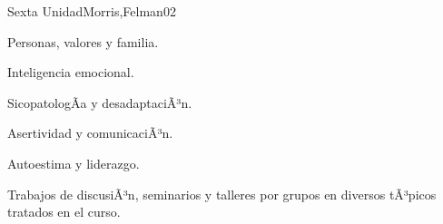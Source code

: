 \begin{syllabus}
\begin{unit}{Sexta Unidad}{Morris,Felman}{0}{2}
\begin{topics}
	\item Personas, valores y familia.
	\item Inteligencia emocional.
	\item SicopatologÃ­a y desadaptaciÃ³n.
	\item Asertividad y comunicaciÃ³n.
	\item Autoestima y liderazgo.
\end{topics}
\begin{unitgoals}
	\item Trabajos de discusiÃ³n, seminarios y talleres por grupos en diversos tÃ³picos tratados en el curso.
\end{unitgoals}
\end{unit}



\begin{coursebibliography}
\end{coursebibliography}

\end{syllabus}
